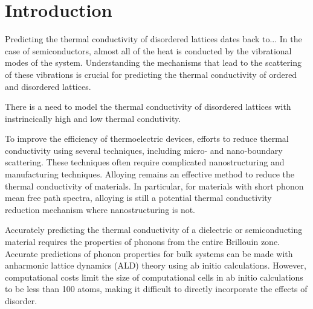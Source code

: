 \documentclass[aps,prb,onecolumn,preprint,superscriptaddress,amsmath,amssymb,floatfix]{revtex4}
\begin{document}
\section{\label{S:Introduction}Introduction}



Predicting the thermal conductivity of disordered lattices dates back to...
In the case of semiconductors, almost all of the heat is conducted by
the vibrational modes of the system. Understanding the mechanisms that lead 
to the scattering of these vibrations is crucial for predicting the 
thermal conductivity of ordered and disordered lattices. 

There is a need to model the thermal conductivity of disordered lattices 
with instrincically high and low thermal condutivity. 

To improve the efficiency of thermoelectric devices, 
efforts to reduce thermal conductivity using several techniques, 
including 
micro- and nano-boundary scattering. These techniques often require 
complicated nanostructuring and manufacturing techniques. 
Alloying remains an effective method to reduce the thermal conductivity 
of materials. In particular, for materials with short phonon mean free path 
spectra, alloying is still a potential thermal conductivity reduction 
mechanism where nanostructuring is not.\cite{tian_phonon_2012}

Accurately predicting the thermal conductivity of a dielectric or 
semiconducting material requires the properties of phonons from the entire 
Brillouin zone. Accurate predictions of phonon properties for bulk systems 
can be made with anharmonic lattice dynamics (ALD) theory 
using ab initio 
calculations.\cite{ward_intrinsic_2010,lindsay_thermal_2012,
garg_role_2011,
shiga_microscopic_2012,tian_phonon_2012,
shiomi_thermal_2011,esfarjani_heat_2011}
However, computational costs limit the size of computational cells 
in ab initio calculations to be less than 100 atoms, making it difficult 
to directly incorporate the effects of disorder.
\cite{koker_thermal_2009,bao_first-principles_2012,
lindsay_thermal_2012,tian_phonon_2012,garg_role_2011}
\end{document}
